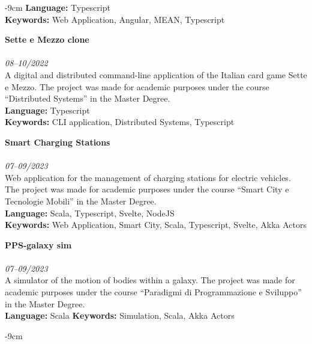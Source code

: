 \documentclass[10pt,a4paper]{altacv}
\begin{document}
\begin{adjustwidth}{}{-9cm}
    \textbf{Language:} Typescript\\
    \textbf{Keywords:} Web Application, Angular, MEAN, Typescript

    \divider

    \textbf{Sette e Mezzo clone}\\
    \\
    \textit{08--10/2022}\\ \smallskip
    A digital and distributed command-line application of the Italian card game Sette e Mezzo. The project was made for academic purposes under the course ``Distributed Systems'' in the Master Degree.\\ \smallskip
    \textbf{Language:} Typescript\\
    \textbf{Keywords:} CLI application, Distributed Systems, Typescript

    \divider

    \textbf{Smart Charging Stations}\\
    \\
    \textit{07--09/2023} \\ \smallskip
    Web application for the management of charging stations for electric vehicles. The project was made for academic purposes under the course ``Smart City e Tecnologie Mobili'' in the Master Degree.\\ \smallskip
    \textbf{Language:} Scala, Typescript, Svelte, NodeJS\\
    \textbf{Keywords:} Web Application, Smart City, Scala, Typescript, Svelte, Akka Actors

    \divider

    \textbf{PPS-galaxy sim}\\
    \\
    \textit{07--09/2023} \\ \smallskip
    A simulator of the motion of bodies within a galaxy. The project was made for academic purposes under the course ``Paradigmi di Programmazione e Sviluppo'' in the Master Degree.\\ \smallskip
    \textbf{Language:} Scala
    \textbf{Keywords:} Simulation, Scala, Akka Actors

\end{adjustwidth}

\begin{adjustwidth}{}{-9cm}


    \divider
\end{adjustwidth}
\end{document}
